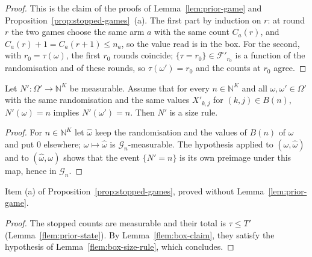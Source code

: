 \documentclass[11pt]{article}
\begin{document}
\begin{proof}
This is the claim of the proofs of Lemma~\ref{lem:prior-game} and
Proposition~\ref{prop:stopped-games}~(a). The first part by induction on $r$: at round $r$ the two
games choose the same arm $a$ with the same count $C_a(r)$, and $C_a(r)+1=C_a(r+1)\le n_a$, so the
value read is in the box. For the second, with $r_0=\tau(\omega)$, the first $r_0$ rounds coincide;
$\{\tau=r_0\}\in\mathcal F'_{r_0}$ is a function of the randomisation and of these rounds, so
$\tau(\omega')=r_0$ and the counts at $r_0$ agree.
\end{proof}

\begin{lemma}\label{flem:box-size-rule}
Let $N'\colon\Omega'\to\mathbb N^K$ be measurable. Assume that for every $n\in\mathbb N^K$ and all
$\omega,\omega'\in\Omega'$ with the same randomisation and the same values $X'_{k,j}$ for
$(k,j)\in B(n)$, $N'(\omega)=n$ implies $N'(\omega')=n$. Then $N'$ is a size rule.
\end{lemma}

\begin{proof}
For $n\in\mathbb N^K$ let $\hat\omega$ keep the randomisation and the values of $B(n)$ of $\omega$
and put $0$ elsewhere; $\omega\mapsto\hat\omega$ is $\mathcal G_n$-measurable. The hypothesis
applied to $(\omega,\hat\omega)$ and to $(\hat\omega,\omega)$ shows that the event $\{N'=n\}$ is its
own preimage under this map, hence in $\mathcal G_n$.
\end{proof}

\begin{lemma}\label{flem:stopped-size-rule}
Item (a) of Proposition~\ref{prop:stopped-games}, proved without Lemma~\ref{lem:prior-game}.
\end{lemma}

\begin{proof}
The stopped counts are measurable and their total is $\tau\le T'$ (Lemma~\ref{flem:prior-state}).
By Lemma~\ref{flem:box-claim}, they satisfy the hypothesis of Lemma~\ref{flem:box-size-rule}, which
concludes.
\end{proof}
\end{document}
